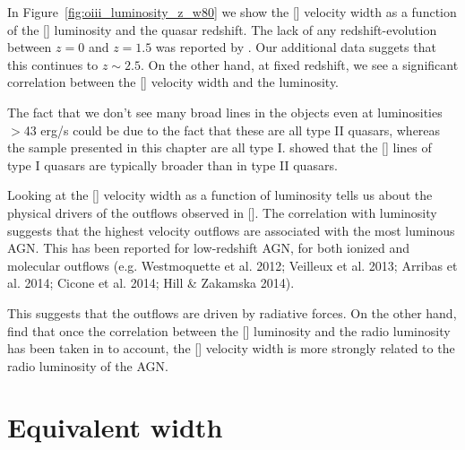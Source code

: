 In Figure~\ref{fig:oiii_luminosity_z_w80} we show the [] velocity width as a function of the [] luminosity and the quasar redshift. 
The lack of any redshift-evolution between $z=0$ and $z=1.5$ was reported by \citet{harrison16}.
Our additional data suggets that this continues to $z\sim2.5$. 
On the other hand, at fixed redshift, we see a significant correlation between the [] velocity width and the luminosity. 

The fact that we don't see many broad lines in the \citet{zakamska14} objects even at luminosities $>$43 erg/s could be due to the fact that these are all type II quasars, whereas the sample presented in this chapter are all type I. 
\citet{mullaney13} showed that the [] lines of type I quasars are typically broader than in type II quasars. 

Looking at the [] velocity width as a function of luminosity tells us about the physical drivers of the outflows observed in []. 
The correlation with luminosity suggests that the highest velocity outflows are associated with the most luminous AGN. 
This has been reported for low-redshift AGN, for both ionized and molecular outflows (e.g. Westmoquette et al. 2012; Veilleux et al. 2013; Arribas et al. 2014; Cicone et al. 2014; Hill \& Zakamska 2014).

This suggests that the outflows are driven by radiative forces. 
On the other hand, \citet{mullaney13} find that once the correlation between the [] luminosity and the radio luminosity has been taken in to account, the [] velocity width is more strongly related to the radio luminosity of the AGN. 

\section{Equivalent width}

